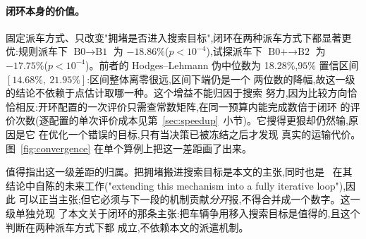 \documentclass[manuscript,screen,review]{acmart}
\newcommand{\NPairs}{100}
\newcommand{\GainLoopRule}{18.86\%}      %
\newcommand{\PLoopRule}{<10^{-4}}
\newcommand{\GainLoopProbe}{17.75\%}     %
\newcommand{\PLoopProbe}{<10^{-4}}
\newcommand{\HLLoopRule}{18.28\%}
\newcommand{\CILoopRule}{$[14.68\%,\ 21.95\%]$}
\begin{document}
\begin{table}[t]
\caption{四级阶梯在同挂钟预算下的完工时间,以及 $2\times 2$ 析因的四个单因子配对比较。
负值表示完工时间下降,即更好。$n=\NPairs$ 个按 $(\text{算例},\text{种子})$ 配对的比较,
双侧 Wilcoxon 符号秩检验;$p$ 值已按本表五个对比做 Holm 校正
($^{*}p<0.05$、$^{**}p<0.01$、$^{***}p<0.001$)。HL 列为逐对相对增益的 Hodges--Lehmann
伪中位数及其 $95\%$ 分布无关置信区间,与左侧的均值口径不同(见第~\ref{sec:protocol}~小节):
均值便于跨表相加,伪中位数则与同行的检验同源并带精度。全文表格统一以\emph{表头}加粗标出
本文的配置,数值一律不加粗——B2 并非每格最优,车臂比 $1.0$ 与 $2.0$ 两格上 B1 更快,逐格读数
见表~\ref{tab:bytag}。}
\label{tab:main}
\small

\end{table}

\paragraph{闭环本身的价值。}
固定派车方式、只改变"拥堵是否进入搜索目标",闭环在两种派车方式下都显著更优:规则派车下
$\text{B0}\to\text{B1}$ 为 $-\GainLoopRule$($p\PLoopRule$),试探派车下
$\text{B0+}\to\text{B2}$ 为 $-\GainLoopProbe$($p\PLoopProbe$)。前者的 Hodges--Lehmann
伪中位数为 \HLLoopRule{},$95\%$ 置信区间 \CILoopRule{}:区间整体离零很远,区间下端仍是一个
两位数的降幅,故这一级的结论不依赖于点估计取哪一种。这个增益不能归因于搜索
努力,因为比较方向恰恰相反:开环配置的一次评价只需查常数矩阵,在同一预算内能完成数倍于闭环
的评价次数(逐配置的单次评价成本见第~\ref{sec:speedup}~小节)。它搜得更狠却仍然输,原因是它
在优化一个错误的目标,只有当决策已被冻结之后才发现
真实的运输代价。图~\ref{fig:convergence} 在单个算例上把这一差距画了出来。

值得指出这一级差距的归属。把拥堵搬进搜索目标是本文的主张,同时也是~\cite{li2026framework}
在其结论中自陈的未来工作("extending this mechanism into a fully iterative loop"),因此
可以正当主张;但它必须与下一段的机制贡献\emph{分开}报,不得合并成一个数字。这一级单独兑现
了本文关于闭环的那条主张:把车辆争用移入搜索目标是值得的,且这个判断在两种派车方式下都
成立,不依赖本文的派遣机制。
\end{document}
